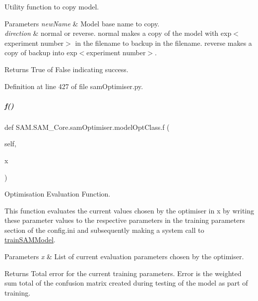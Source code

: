 Utility function to copy model. 


\begin{DoxyParams}{Parameters}
{\em new\+Name} & Model base name to copy. \\
\hline
{\em direction} & {\ttfamily normal} or {\ttfamily reverse}. {\ttfamily normal} makes a copy of the model with {\ttfamily exp$<$experiment number$>$} in the filename to {\ttfamily backup} in the filename. {\ttfamily reverse} makes a copy of {\ttfamily backup} into {\ttfamily exp$<$experiment number$>$}.\\
\hline
\end{DoxyParams}
\begin{DoxyReturn}{Returns}
True of False indicating success. 
\end{DoxyReturn}


Definition at line 427 of file sam\+Optimiser.\+py.

\mbox{\label{group__icubclient__SAM__Core_a8d4a0fad429d8fab65c4a13e2141735e}} 
\subparagraph{\texorpdfstring{f()}{f()}}
{\footnotesize\ttfamily def S\+A\+M.\+S\+A\+M\+\_\+\+Core.\+sam\+Optimiser.\+model\+Opt\+Class.\+f (\begin{DoxyParamCaption}\item[{}]{self,  }\item[{}]{x }\end{DoxyParamCaption})}



Optimisation Evaluation Function. 

This function evaluates the current values chosen by the optimiser in {\ttfamily x} by writing these parameter values to the respective parameters in the training parameters section of the config.\+ini and subsequently making a system call to \hyperlink{namespaceSAM_1_1SAM__Core_1_1trainSAMModel}{train\+S\+A\+M\+Model}.


\begin{DoxyParams}{Parameters}
{\em x} & List of current evaluation parameters chosen by the optimiser.\\
\hline
\end{DoxyParams}
\begin{DoxyReturn}{Returns}
Total error for the current training parameters. Error is the weighted sum total of the confusion matrix created during testing of the model as part of training. 
\end{DoxyReturn}


